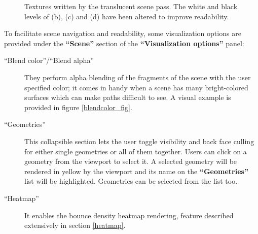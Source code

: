 \begin{figure}
	\caption{Textures written by the translucent scene pass. The white and black levels of (b), (c) and (d) have been altered to improve readability.}
	\label{translucent_pass}
\end{figure}

To facilitate scene navigation and readability, some visualization options are provided under the \textbf{“Scene”} section of the \textbf{“Visualization options”} panel:
\begin{description}
	\item[“Blend color”/“Blend alpha”] They perform alpha blending of the fragments of the scene with the user specified color; it comes in handy when a scene has many bright-colored surfaces which can make paths difficult to see. A visual example is provided in figure \ref{blendcolor_fig}.
	\item[“Geometries”] This collapsible section lets the user toggle visibility and back face culling for either single geometries or all of them together. Users can click on a geometry from the viewport to select it. A selected geometry will be rendered in yellow by the viewport and its name on the \textbf{“Geometries”} list will be highlighted. Geometries can be selected from the list too.
	\item[“Heatmap”] It enables the bounce density heatmap rendering, feature described extensively in section \ref{heatmap}.
\end{description}

